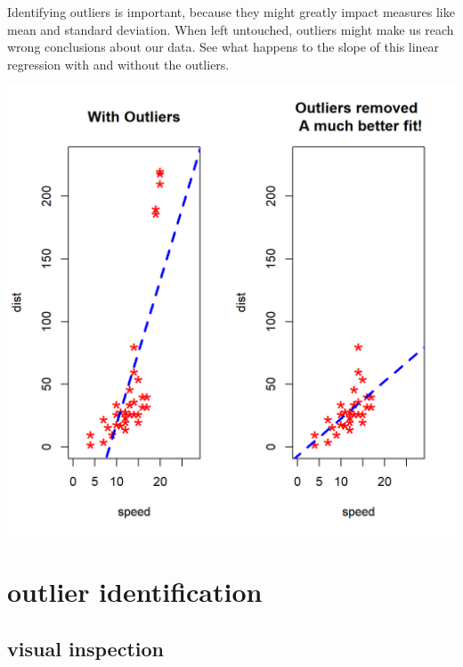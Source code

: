\documentclass[
  letterpaper,
  DIV=11,
  numbers=noendperiod,
  oneside]{scrreprt}
\begin{document}
Identifying outliers is important, because they might greatly impact
measures like mean and standard deviation. When left untouched, outliers
might make us reach wrong conclusions about our data. See what happens
to the slope of this linear regression with and without the outliers.

\includegraphics{outliers/regression-outlier.png}


\hypertarget{outlier-identification}{%
\chapter{outlier identification}\label{outlier-identification}}

\hypertarget{visual-inspection}{%
\section{visual inspection}\label{visual-inspection}}
\end{document}
